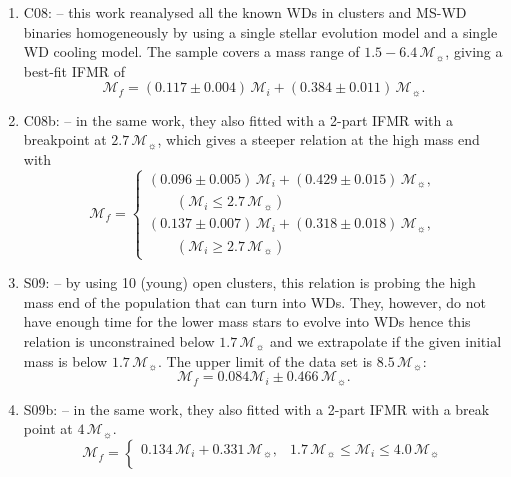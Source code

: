 \documentclass[fleqn,usenatbib]{rasti}
\newcommand{\msun}{\mathcal{M}_{\sun}}
\begin{document}
\begin{enumerate}
    \item C08: \citet{2008MNRAS.387.1693C} -- this work reanalysed all the known WDs in clusters and MS-WD binaries homogeneously by using a single stellar evolution model and a single WD cooling model. The sample covers a mass range of $1.5-6.4\,\msun$, giving a best-fit IFMR of
    \begin{equation}
        \mathcal{M}_f = (0.117 \pm 0.004)\,\mathcal{M}_i + (0.384 \pm 0.011)\,\msun.
    \end{equation}
    \item C08b: \citet[][two-part]{2008MNRAS.387.1693C} -- in the same work, they also fitted with a 2-part IFMR with a breakpoint at $2.7\,\msun$, which gives a steeper relation at the high mass end with
    \begin{equation}
        \mathcal{M}_f = \begin{cases}
                  (0.096 \pm 0.005)\,\mathcal{M}_i + (0.429 \pm 0.015)\,\msun,\\
                  \qquad(\mathcal{M}_i \leq 2.7\,\msun)\\
                  (0.137 \pm 0.007)\,\mathcal{M}_i + (0.318 \pm 0.018)\,\msun,\\
                  \qquad(\mathcal{M}_i \geq 2.7\,\msun)
              \end{cases}
    \end{equation}
    \item S09: \citet{2009ApJ...692.1013S} -- by using 10 (young) open clusters, this relation is probing the high mass end of the population that can turn into WDs. They, however, do not have enough time for the lower mass stars to evolve into WDs hence this relation is unconstrained below $1.7\,\msun$ and we extrapolate if the given initial mass is below $1.7\,\msun$. The upper limit of the data set is $8.5\,\msun$:
    \begin{equation}
        \mathcal{M}_f = 0.084 \mathcal{M}_i \pm 0.466\,\msun.
    \end{equation}
    \item S09b: \citet[][two-part]{2009ApJ...692.1013S} -- in the same work, they also fitted with a 2-part IFMR with a break point at $4\,\msun$.
    \begin{equation}
        \mathcal{M}_f = \begin{cases}
                  0.134\,\mathcal{M}_i + 0.331\,\msun, &1.7\,\msun \leq \mathcal{M}_i \leq 4.0\,\msun\\

\end{cases}
\end{equation}
\end{enumerate}
\end{document}

